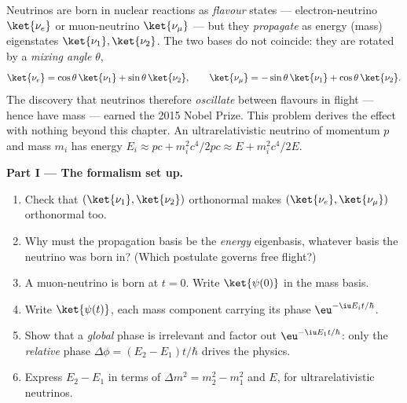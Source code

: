 \begin{problem}\label{pb:b3:quantum-formalism:1}
Neutrinos are born in nuclear reactions as \emph{flavour} states ---
electron-neutrino $\ket{\nu_e}$ or muon-neutrino $\ket{\nu_\mu}$ ---
but they \emph{propagate} as energy (mass) eigenstates $\ket{\nu_1},
\ket{\nu_2}$. The two bases do not coincide: they are rotated by a
\emph{mixing angle} $\theta$,
\[
\ket{\nu_e} = \cos\theta\,\ket{\nu_1} + \sin\theta\,\ket{\nu_2} ,
\qquad
\ket{\nu_\mu} = -\sin\theta\,\ket{\nu_1} + \cos\theta\,\ket{\nu_2} .
\]
The discovery that neutrinos therefore \emph{oscillate} between
flavours in flight --- hence have mass --- earned the 2015 Nobel
Prize. This problem derives the effect with nothing beyond this
chapter. An ultrarelativistic neutrino of momentum $p$ and mass
$m_i$ has energy $E_i \approx pc + m_i^2c^4/2pc \approx E +
m_i^2c^4/2E$.

\medskip\noindent\textbf{Part I --- The formalism set up.}
\begin{enumerate}
  \item Check that $(\ket{\nu_1}, \ket{\nu_2})$ orthonormal makes
        $(\ket{\nu_e}, \ket{\nu_\mu})$ orthonormal too.
  \item Why must the propagation basis be the \emph{energy}
        eigenbasis, whatever basis the neutrino was born in? (Which
        postulate governs free flight?)
  \item A muon-neutrino is born at $t = 0$. Write $\ket{\psi(0)}$ in
        the mass basis.
  \item Write $\ket{\psi(t)}$, each mass component carrying its
        phase $\eu^{-\iu E_it/\hbar}$.
  \item Show that a \emph{global} phase is irrelevant and factor out
        $\eu^{-\iu E_1t/\hbar}$: only the \emph{relative} phase
        $\Delta\phi = (E_2 - E_1)t/\hbar$ drives the physics.
  \item Express $E_2 - E_1$ in terms of $\Delta m^2 = m_2^2 - m_1^2$
        and $E$, for ultrarelativistic neutrinos.
\end{enumerate}


\end{problem}
